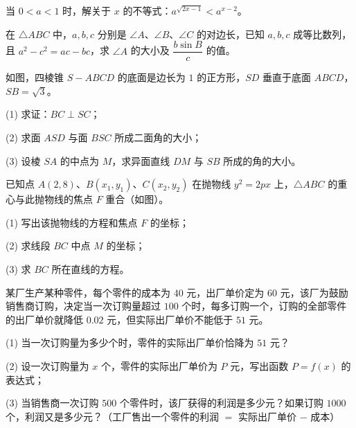 \begin{question}
当 $0<a<1$ 时，解关于 $x$ 的不等式：$a^{\sqrt{2x-1}}<a^{x-2}$。

\end{question}
\begin{question}
在 $\triangle ABC$ 中，$a,b,c$ 分别是 $\angle A$、$\angle B$、$\angle C$ 的对边长，已知 $a,b,c$ 成等比数列，且 $a^2-c^2=ac-bc$，求 $\angle A$ 的大小及 $\dfrac{b\sin B}{c}$ 的值。

\Needspace{0.4\textheight}
\end{question}
\begin{question}
如图，四棱锥 $S-ABCD$ 的底面是边长为 $1$ 的正方形，$SD$ 垂直于底面 $ABCD$，$SB=\sqrt3$。

(1) 求证：$BC\perp SC$；

(2) 求面 $ASD$ 与面 $BSC$ 所成二面角的大小；

(3) 设棱 $SA$ 的中点为 $M$，求异面直线 $DM$ 与 $SB$ 所成的角的大小。
\nopagebreak[4]
\begin{center}\end{center}
\nopagebreak[4]
\Needspace{0.4\textheight}
\end{question}
\begin{question}
已知点 $A(2,8)$、$B(x_1,y_1)$、$C(x_2,y_2)$ 在抛物线 $y^2=2px$ 上，$\triangle ABC$ 的重心与此抛物线的焦点 $F$ 重合（如图）。

(1) 写出该抛物线的方程和焦点 $F$ 的坐标；

(2) 求线段 $BC$ 中点 $M$ 的坐标；

(3) 求 $BC$ 所在直线的方程。
\nopagebreak[4]
\begin{center}\end{center}
\nopagebreak[4]
\end{question}
\begin{question}
某厂生产某种零件，每个零件的成本为 $40$ 元，出厂单价定为 $60$ 元，该厂为鼓励销售商订购，决定当一次订购量超过 $100$ 个时，每多订购一个，订购的全部零件的出厂单价就降低 $0.02$ 元，但实际出厂单价不能低于 $51$ 元。

(1) 当一次订购量为多少个时，零件的实际出厂单价恰降为 $51$ 元？

(2) 设一次订购量为 $x$ 个，零件的实际出厂单价为 $P$ 元，写出函数 $P=f(x)$ 的表达式；

(3) 当销售商一次订购 $500$ 个零件时，该厂获得的利润是多少元？如果订购 $1000$ 个，利润又是多少元？（工厂售出一个零件的利润 $=$ 实际出厂单价 $-$ 成本）

\end{question}
